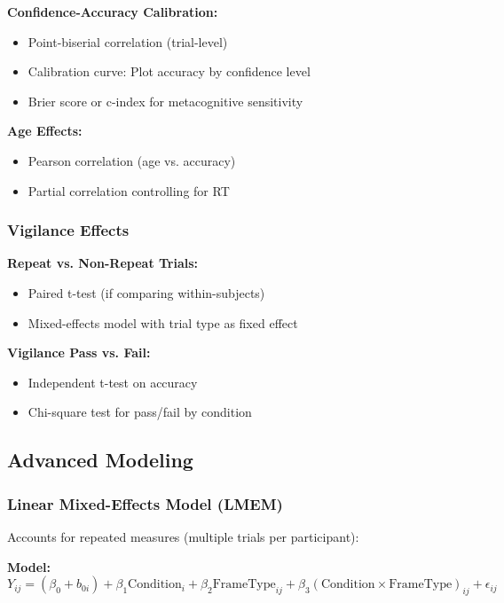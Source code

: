 \documentclass[12pt,a4paper]{article}
\begin{document}
\textbf{Confidence-Accuracy Calibration:}
\begin{itemize}
    \item Point-biserial correlation (trial-level)
    \item Calibration curve: Plot accuracy by confidence level
    \item Brier score or c-index for metacognitive sensitivity
\end{itemize}

\textbf{Age Effects:}
\begin{itemize}
    \item Pearson correlation (age vs. accuracy)
    \item Partial correlation controlling for RT
\end{itemize}

\subsubsection{Vigilance Effects}

\textbf{Repeat vs. Non-Repeat Trials:}
\begin{itemize}
    \item Paired t-test (if comparing within-subjects)
    \item Mixed-effects model with trial type as fixed effect
\end{itemize}

\textbf{Vigilance Pass vs. Fail:}
\begin{itemize}
    \item Independent t-test on accuracy
    \item Chi-square test for pass/fail by condition
\end{itemize}

\subsection{Advanced Modeling}

\subsubsection{Linear Mixed-Effects Model (LMEM)}

Accounts for repeated measures (multiple trials per participant):

\textbf{Model:}
\begin{equation}
Y_{ij} = (\beta_0 + b_{0i}) + \beta_1 \text{Condition}_i + \beta_2 \text{FrameType}_{ij} + \beta_3 (\text{Condition} \times \text{FrameType})_{ij} + \epsilon_{ij}
\end{equation}
\end{document}
